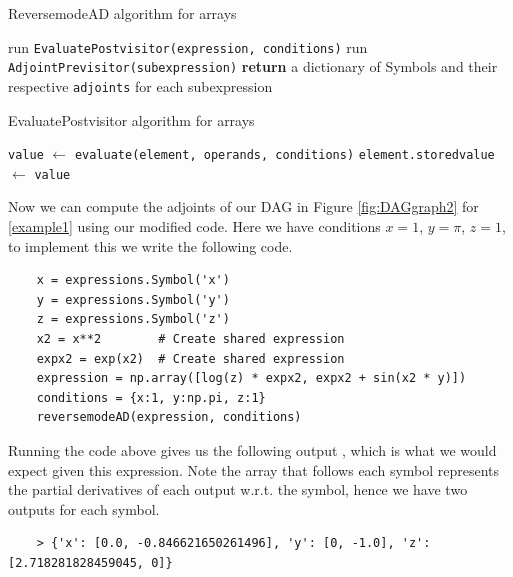 \documentclass{article}
\begin{document}
\begin{algorithm}[h]
\caption{ReversemodeAD algorithm for arrays}\label{reverseADArr}
\begin{algorithmic}[1]
\State run \verb|EvaluatePostvisitor(expression, conditions)|
\State run \verb|AdjointPrevisitor(subexpression)|
\EndFor
\State \textbf{return} a dictionary of Symbols and their respective \verb|adjoints| for each subexpression
\EndProcedure
\end{algorithmic}
\end{algorithm}

\begin{algorithm}[h!]
\caption{EvaluatePostvisitor algorithm for arrays}\label{EvaluatePostvisitorArr}
\begin{algorithmic}[1]
\State \verb|value| $\gets$ \verb|evaluate(element, operands, conditions)|
\State \verb|element.storedvalue| $\gets$ \verb|value|
\EndFor
\EndFor
\EndProcedure
\end{algorithmic}
\end{algorithm}

Now we can compute the adjoints of our DAG in Figure \ref{fig:DAGgraph2} for \eqref{example1} using our modified code. Here we have conditions $x=1$, $y=\pi$, $z=1$, to implement this we write the following code.

\begin{verbatim}
    x = expressions.Symbol('x')
    y = expressions.Symbol('y')
    z = expressions.Symbol('z')
    x2 = x**2        # Create shared expression
    expx2 = exp(x2)  # Create shared expression
    expression = np.array([log(z) * expx2, expx2 + sin(x2 * y)])
    conditions = {x:1, y:np.pi, z:1}
    reversemodeAD(expression, conditions)
\end{verbatim}

Running the code above gives us the following output \cite{github}, which is what we would expect given this expression. Note the array that follows each symbol represents the partial derivatives of each output w.r.t. the symbol, hence we have two outputs for each symbol.
\begin{verbatim}
    > {'x': [0.0, -0.846621650261496], 'y': [0, -1.0], 'z': [2.718281828459045, 0]}
\end{verbatim}
\end{document}
